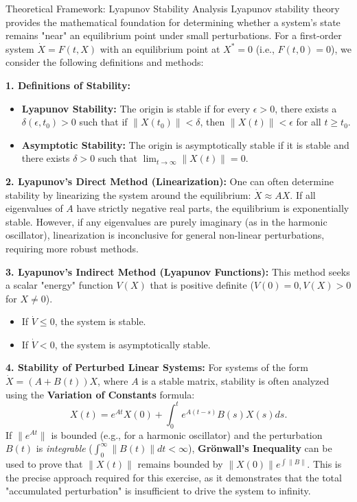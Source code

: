 \begin{remarkbox}{Theoretical Framework: Lyapunov Stability Analysis}
Lyapunov stability theory provides the mathematical foundation for determining whether a system's state remains "near" an equilibrium point under small perturbations. For a first-order system $\dot{X} = F(t, X)$ with an equilibrium point at $X^* = 0$ (i.e., $F(t, 0) = 0$), we consider the following definitions and methods:

\textbf{1. Definitions of Stability:}
\begin{itemize}
    \item \textbf{Lyapunov Stability:} The origin is stable if for every $\epsilon > 0$, there exists a $\delta(\epsilon, t_0) > 0$ such that if $\|X(t_0)\| < \delta$, then $\|X(t)\| < \epsilon$ for all $t \geq t_0$.
    \item \textbf{Asymptotic Stability:} The origin is asymptotically stable if it is stable and there exists $\delta > 0$ such that $\lim_{t \to \infty} \|X(t)\| = 0$.
\end{itemize}

\textbf{2. Lyapunov's Direct Method (Linearization):}
One can often determine stability by linearizing the system around the equilibrium: $\dot{X} \approx AX$. If all eigenvalues of $A$ have strictly negative real parts, the equilibrium is exponentially stable. However, if any eigenvalues are purely imaginary (as in the harmonic oscillator), linearization is inconclusive for general non-linear perturbations, requiring more robust methods.

\textbf{3. Lyapunov's Indirect Method (Lyapunov Functions):}
This method seeks a scalar "energy" function $V(X)$ that is positive definite ($V(0)=0, V(X)>0$ for $X \neq 0$). 
\begin{itemize}
    \item If $\dot{V} \leq 0$, the system is stable.
    \item If $\dot{V} < 0$, the system is asymptotically stable.
\end{itemize}

\textbf{4. Stability of Perturbed Linear Systems:}
For systems of the form $\dot{X} = (A + B(t))X$, where $A$ is a stable matrix, stability is often analyzed using the \textbf{Variation of Constants} formula:
\[ X(t) = e^{At} X(0) + \int_{0}^{t} e^{A(t-s)} B(s) X(s) ds. \]
If $\|e^{At}\|$ is bounded (e.g., for a harmonic oscillator) and the perturbation $B(t)$ is \textit{integrable} ($\int_0^\infty \|B(t)\| dt < \infty$), \textbf{Gr\"onwall's Inequality} can be used to prove that $\|X(t)\|$ remains bounded by $\|X(0)\| e^{\int \|B\|}$. This is the precise approach required for this exercise, as it demonstrates that the total "accumulated perturbation" is insufficient to drive the system to infinity.
\end{remarkbox}

